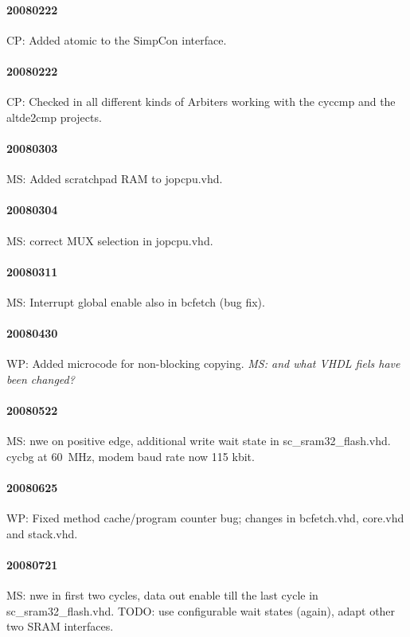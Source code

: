 \documentclass[a4paper,12pt]{scrartcl}
\newcommand{\code}[1]{{\textsf{#1}}}
\begin{document}
\paragraph{20080222} CP: Added atomic to the SimpCon interface.

\paragraph{20080222} CP: Checked in all different kinds of Arbiters working with the
\code{cyccmp} and the \code{altde2cmp} projects.

\paragraph{20080303} MS: Added scratchpad RAM to \code{jopcpu.vhd}.

\paragraph{20080304} MS: correct MUX selection in \code{jopcpu.vhd}.

\paragraph{20080311} MS: Interrupt global enable also in \code{bcfetch} (bug
fix).

\paragraph{20080430} WP: Added microcode for non-blocking copying.
\emph{MS: and what VHDL fiels have been changed?}

\paragraph{20080522} MS: \code{nwe} on positive edge, additional
write wait state in \code{sc\_sram32\_flash.vhd}. \code{cycbg} at
60~MHz, modem baud rate now 115 kbit.

\paragraph{20080625} WP: Fixed method cache/program counter bug; changes in
\code{bcfetch.vhd}, \code{core.vhd} and \code{stack.vhd}.

\paragraph{20080721} MS: \code{nwe} in first two cycles, data out
enable till the last cycle in \code{sc\_sram32\_flash.vhd}. TODO: use
configurable wait states (again), adapt other two SRAM interfaces.
\end{document}
